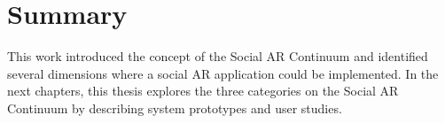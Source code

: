 


\section{Summary}

This work introduced the concept of the Social AR Continuum and identified several dimensions where a social AR application could be implemented.
In the next chapters, this thesis explores the three categories on the Social AR Continuum by describing system prototypes and user studies. 

